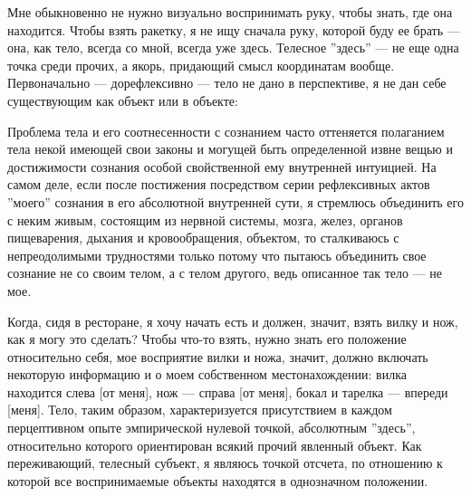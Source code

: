 \documentclass[11pt]{book}
\begin{document}
Мне обыкновенно не нужно визуально воспринимать руку, чтобы знать, где она находится. Чтобы взять ракетку, я не ищу сначала руку, которой буду ее брать --- она, как тело, всегда со мной, всегда уже здесь. Телесное ''здесь'' --- не еще одна точка среди прочих, а якорь, придающий смысл координатам вообще. Первоначально --- дорефлексивно --- тело не дано в перспективе, я не дан себе существующим как объект или в объекте:

\smallskip
{}\relax
{}\relax

Проблема тела и его соотнесенности с сознанием часто оттеняется полаганием тела некой имеющей свои законы и могущей быть определенной извне вещью и достижимости сознания особой свойственной ему внутренней интуицией. На самом деле, если после постижения посредством серии рефлексивных актов ''моего'' сознания в его абсолютной внутренней сути, я стремлюсь объединить его с неким живым, состоящим из нервной системы, мозга, желез, органов пищеварения, дыхания и кровообращения, объектом, то сталкиваюсь с непреодолимыми трудностями только потому что пытаюсь объединить свое сознание не со своим телом, а с телом другого, ведь описанное так тело --- не мое.

\relax
{}\relax
\smallskip

Когда, сидя в ресторане, я хочу начать есть и должен, значит, взять вилку и нож, как я могу это сделать? Чтобы что-то взять, нужно знать его положение относительно себя, мое восприятие вилки и ножа, значит, должно включать некоторую информацию и о моем собственном местонахождении: вилка находится слева [от меня], нож --- справа [от меня], бокал и тарелка --- впереди [меня]. Тело, таким образом, характеризуется присутствием в каждом перцептивном опыте эмпирической нулевой точкой, абсолютным ''здесь'', относительно которого ориентирован всякий прочий явленный объект. Как переживающий, телесный субъект, я являюсь точкой отсчета, по отношению к которой все воспринимаемые объекты находятся в однозначном положении.
\end{document}
